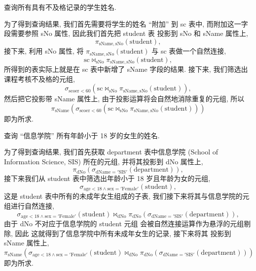 \documentclass[10pt,UTF8]{book} %
\begin{document}
\begin{example}
    查询所有具有不及格记录的学生姓名.
    \begin{sol}
        为了得到查询结果, 我们首先需要将学生的姓名 “附加” 到 sc 表中,
        而附加这一字段需要参照 sNo 属性, 因此我们首先把 student 表
        投影到 sNo 和 sName 属性上,
        \[ \pi_{\mathrm{sName, sNo}}(\mathrm{student}), \]
        接下来, 利用 sNo 属性, 将 $\pi_{\mathrm{sName, sNo}}(\mathrm{student})$
        与 sc 表做一个自然连接,
        \[ \mathrm{sc} \Join_\mathrm{sNo}
        \pi_{\mathrm{sName, sNo}}(\mathrm{student}), \]
        所得到的表实际上就是在 sc 表中新增了 sName 字段的结果.
        接下来, 我们筛选出课程考核不及格的元组,
        \[ \sigma_{\mathrm{scoer} < 60}\left(
            \mathrm{sc} \Join_\mathrm{sNo}
        \pi_{\mathrm{sName, sNo}}(\mathrm{student})
        \right), \]
        然后把它投影带 sName 属性上, 由于投影运算将会自然地消除重复的元组,
        所以
        \[ \pi_\mathrm{sName} \left(
            \sigma_{\mathrm{scoer} < 60}\left(
            \mathrm{sc} \Join_\mathrm{sNo}
        \pi_{\mathrm{sName, sNo}}(\mathrm{student})
        \right)
        \right) \]
        即为所求.
    \end{sol}
\end{example}

\begin{example}
    查询 “信息学院” 所有年龄小于 18 岁的女生的姓名.
    \begin{sol}
        为了得到查询结果, 我们首先获取 department 表中信息学院
        (School of Information Science, SIS)
        所在的元组,
        并将其投影到 dNo 属性上,
        \[ \pi_\mathrm{dNo}\left(
            \sigma_\mathrm{dName='SIS'} (\mathrm{department})
        \right),\]
        接下来我们从 student 表中筛选出年龄小于 18 岁且年龄为女的元组,
        \[ \sigma_\mathrm{age < 18 \wedge sex='Female'} \left(
            \mathrm{student}
        \right), \]
        这是 student 表中所有的未成年女生组成的子表,
        我们接下来将其与信息学院的元组进行自然连接,
        \[ \sigma_\mathrm{age < 18 \wedge sex='Female'} \left(
            \mathrm{student}
        \right) \Join_\mathrm{dNo} \pi_\mathrm{dNo}\left(
            \sigma_\mathrm{dName='SIS'} (\mathrm{department})
        \right), \]
        由于 dNo 不对应于信息学院的 student 元组
        会被自然连接运算作为悬浮的元组剔除, 因此
        这就得到了信息学院中所有未成年女生的记录, 接下来将其
        投影到 sName 属性上, 
        \[ \pi_\mathrm{sName} \left(
            \sigma_\mathrm{age < 18 \wedge sex='Female'} \left(
            \mathrm{student}
        \right) \Join_\mathrm{dNo} \pi_\mathrm{dNo}\left(
            \sigma_\mathrm{dName='SIS'} (\mathrm{department})
        \right)
        \right) \]
        即为所求.
    \end{sol}
\end{example}
\end{document}
